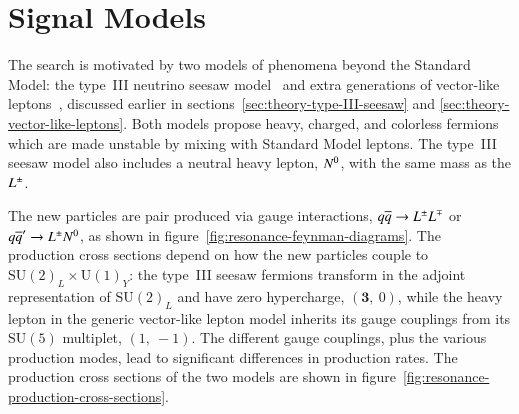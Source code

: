\section{Signal Models}\label{sec:resonance-signal-models}
The search is motivated by two models of phenomena beyond the Standard Model: the type~III neutrino seesaw model~\cite{Biggio:1368793} and extra generations of vector-like leptons~\cite{Martin:2009it}, discussed earlier in sections~\ref{sec:theory-type-III-seesaw} and \ref{sec:theory-vector-like-leptons}. Both models propose heavy, charged, and colorless fermions which are made unstable by mixing with Standard Model leptons. The type~III seesaw model also includes a neutral heavy lepton, $N^{0}$, with the same mass as the $L^{\pm}$. 

The new particles are pair produced via gauge interactions, $q\overline{q}\rightarrow L^{\pm}L^{\mp}$ or $q\overline{q}'\rightarrow L^{\pm}N^{0}$, as shown in figure~\ref{fig:resonance-feynman-diagrams}. The production cross sections depend on how the new particles couple to $\mathrm{SU}(2)_L\times \mathrm{U}(1)_Y$: the type~III seesaw fermions transform in the adjoint representation of $\mathrm{SU}(2)_L$ and have zero hypercharge, $(\mathbf{3},\ 0)$, while the heavy lepton in the generic vector-like lepton model inherits its gauge couplings from its $\mathrm{SU}(5)$ multiplet, $(1,\ -1)$.  The different gauge couplings, plus the various production modes, lead to significant differences in production rates. The production cross sections of the two models are shown in figure~\ref{fig:resonance-production-cross-sections}.

